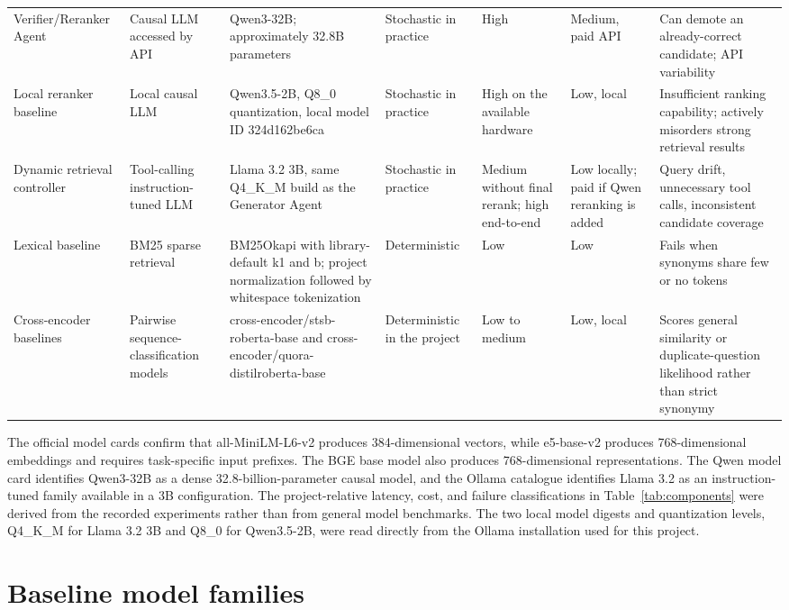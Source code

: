 \begin{longtable}{p{1.85cm}p{1.95cm}p{2.7cm}p{1.6cm}p{1.1cm}p{1.5cm}p{2.5cm}}
Verifier/Reranker Agent & Causal LLM accessed by API & Qwen3-32B; approximately 32.8B parameters & Stochastic in practice & High & Medium, paid API & Can demote an already-correct candidate; API variability\\
Local reranker baseline & Local causal LLM & Qwen3.5-2B, Q8\_0 quantization, local model ID 324d162be6ca & Stochastic in practice & High on the available hardware & Low, local & Insufficient ranking capability; actively misorders strong retrieval results\\
Dynamic retrieval controller & Tool-calling instruction-tuned LLM & Llama 3.2 3B, same Q4\_K\_M build as the Generator Agent & Stochastic in practice & Medium without final rerank; high end-to-end & Low locally; paid if Qwen reranking is added & Query drift, unnecessary tool calls, inconsistent candidate coverage\\
Lexical baseline & BM25 sparse retrieval & BM25Okapi with library-default k1 and b; project normalization followed by whitespace tokenization & Deterministic & Low & Low & Fails when synonyms share few or no tokens\\
Cross-encoder baselines & Pairwise sequence-classification models & cross-encoder/stsb-roberta-base and cross-encoder/quora-distilroberta-base & Deterministic in the project & Low to medium & Low, local & Scores general similarity or duplicate-question likelihood rather than strict synonymy\\
\end{longtable}
\endgroup

The official model cards confirm that all-MiniLM-L6-v2 produces 384-dimensional vectors, while e5-base-v2 produces 768-dimensional embeddings and requires task-specific input prefixes. The BGE base model also produces 768-dimensional representations. The Qwen model card identifies Qwen3-32B as a dense 32.8-billion-parameter causal model, and the Ollama catalogue identifies Llama 3.2 as an instruction-tuned family available in a 3B configuration. The project-relative latency, cost, and failure classifications in Table~\ref{tab:components} were derived from the recorded experiments rather than from general model benchmarks. The two local model digests and quantization levels, Q4\_K\_M for Llama 3.2 3B and Q8\_0 for Qwen3.5-2B, were read directly from the Ollama installation used for this project.

\section{Baseline model families}


